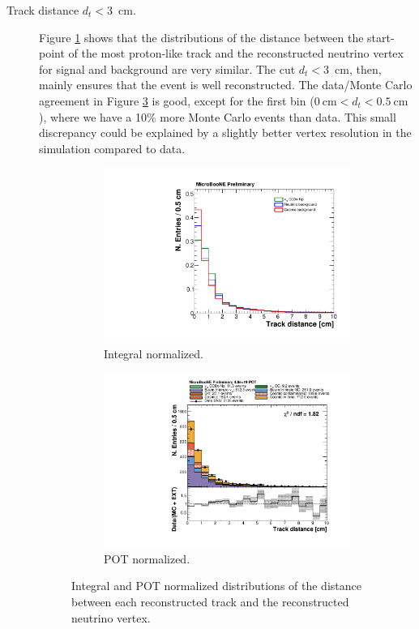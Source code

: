 \begin{description}
\item[Track distance $d_{t} < 3$~cm.] Figure \ref{fig:track_norm} shows that the distributions of the distance between the start-point of the most proton-like track and the reconstructed neutrino vertex for signal and background are very similar. The cut $d_{t} < 3$~cm, then, mainly ensures that the event is well reconstructed. The data/Monte Carlo agreement in Figure \ref{fig:track_pot} is good, except for the first bin ($0~\mathrm{cm} < d_{t} < 0.5~\mathrm{cm}$), where we have a 10\% more Monte Carlo events than data. This small discrepancy could be explained by a slightly better vertex resolution in the simulation compared to data.

\begin{figure}[htbp]
\centering
  \begin{subfigure}{0.45\textwidth}
    \includegraphics[width=\linewidth]{figures/h_track_distance_norm.pdf}
    \caption{Integral normalized.} \label{fig:track_norm}
  \end{subfigure}
    \begin{subfigure}{0.45\textwidth}
    \includegraphics[width=\linewidth]{figures/h_track_distance.pdf}
    \caption{POT normalized.} \label{fig:track_pot}
  \end{subfigure}
  \caption{Integral and POT normalized distributions of the distance between each reconstructed track and the reconstructed neutrino vertex.}
\end{figure}


\end{description}
